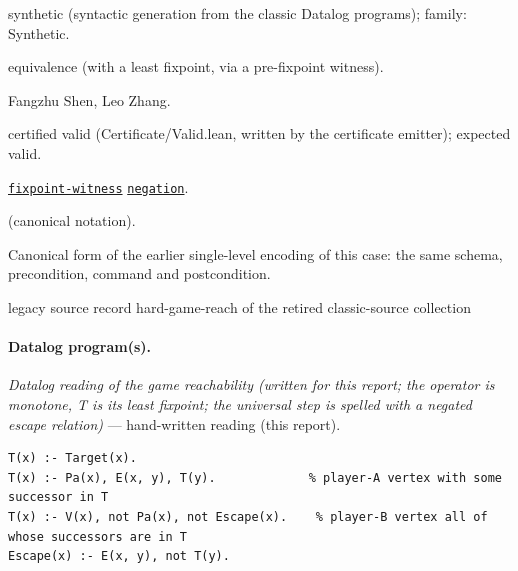 \documentclass[10pt]{article}
\begin{document}
\begin{description}[leftmargin=2.6cm,style=nextline,itemsep=1pt]

\item[Category] synthetic (syntactic generation from the classic Datalog programs); family: Synthetic.

\item[Kind] equivalence (with a least fixpoint, via a pre-fixpoint witness).

\item[Contributors] Fangzhu Shen, Leo Zhang.

\item[Status] certified valid (Certificate/Valid.lean, written by the certificate emitter); expected valid.

\item[Tags] \hyperref[tag:fixpoint-witness]{\texttt{fixpoint-witness}} \hyperref[tag:negation]{\texttt{negation}}.

\item[Input]  (canonical notation).

\item[Summary] Canonical form of the earlier single-level encoding of this case: the same schema, precondition, command and postcondition.

\item[Sources] {\raggedright legacy source record hard-game-reach of the retired classic-source collection\par}

\end{description}

\paragraph{Datalog program(s).}

{\raggedright\textit{Datalog reading of the game reachability (written for this report; the operator is monotone, T is its least fixpoint; the universal step is spelled with a negated escape relation)} --- hand-written reading (this report).\par}

\begin{Verbatim}[fontsize=\scriptsize,breaklines=true,breakanywhere=true,frame=single,framesep=1.5mm]
T(x) :- Target(x).
T(x) :- Pa(x), E(x, y), T(y).             % player-A vertex with some successor in T
T(x) :- V(x), not Pa(x), not Escape(x).    % player-B vertex all of whose successors are in T
Escape(x) :- E(x, y), not T(y).
\end{Verbatim}
\end{document}
